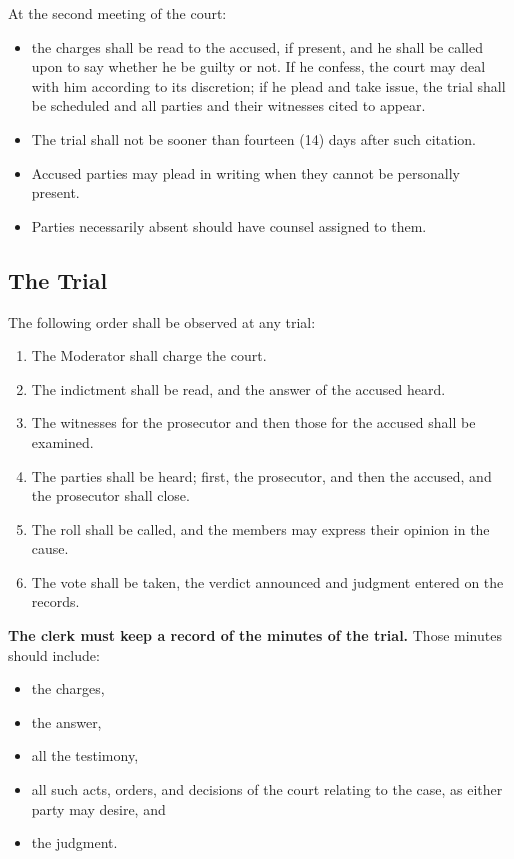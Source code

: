 \documentclass[
]{book}
\providecommand{\tightlist}{%
  \setlength{\itemsep}{0pt}\setlength{\parskip}{0pt}}
\begin{document}
At the second meeting of the court:

\begin{itemize}
\tightlist
\item
  the charges shall be read to the accused, if present, and he shall be called upon to say whether he be guilty or not. If he confess, the court may deal with him according to its discretion; if he plead and take issue, the trial shall be scheduled and all parties and their witnesses cited to appear.
\item
  The trial shall not be sooner than fourteen (14) days after such citation.
\item
  Accused parties may plead in writing when they cannot be personally present.
\item
  Parties necessarily absent should have counsel assigned to them.
\end{itemize}

\hypertarget{the-trial}{%
\subsection{The Trial}\label{the-trial}}

The following order shall be observed at any trial:

\begin{enumerate}
\def\labelenumi{\arabic{enumi}.}
\tightlist
\item
  The Moderator shall charge the court.
\item
  The indictment shall be read, and the answer of the accused heard.
\item
  The witnesses for the prosecutor and then those for the accused shall be examined.
\item
  The parties shall be heard; first, the prosecutor, and then the accused, and the prosecutor shall close.
\item
  The roll shall be called, and the members may express their opinion in the cause.
\item
  The vote shall be taken, the verdict announced and judgment entered on the records.
\end{enumerate}

\textbf{The clerk must keep a record of the minutes of the trial.} Those minutes should include:

\begin{itemize}
\tightlist
\item
  the charges,
\item
  the answer,
\item
  all the testimony,
\item
  all such acts, orders, and decisions of the court relating to the case, as either party may desire, and
\item
  the judgment.
\end{itemize}
\end{document}
